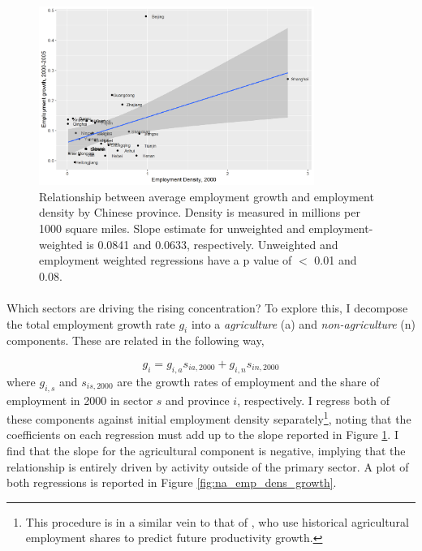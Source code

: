 \documentclass[]{article}
\theoremstyle{plain}
\begin{document}
\begin{center}
\begin{figure}[h]
	\centering
	\includegraphics[width=0.8\textwidth]{emp_growth_density.png}
	\caption{Relationship between average employment growth and employment density by Chinese province. Density is measured in millions per 1000 square miles. Slope estimate for unweighted and employment-weighted is 0.0841 and 0.0633, respectively.  Unweighted and employment weighted regressions have a p value of $<$ 0.01 and 0.08.}
	\label{fig:emp_dens_growth}
\end{figure}
\end{center}

\paragraph*{}
Which sectors are driving the rising concentration? To explore this, I decompose the total employment growth rate $g_{i}$ into a \textit{agriculture} (a) and \textit{non-agriculture} (n) components. These are related in the following way,

\begin{equation*}
g_{i} = g_{i, a}s_{ia, 2000} + g_{i, n}s_{in, 2000}
\end{equation*}
where $g_{i, s}$ and $s_{is, 2000}$ are the growth rates of employment and the share of employment in 2000 in sector $s$ and province $i$, respectively. I regress both of these components against initial employment density separately\footnote{This procedure is in a similar vein to that of \citet{urbstruct}, who use historical agricultural employment shares to predict future productivity growth.}, noting that the coefficients on each regression must add up to the slope reported in Figure \ref{fig:emp_dens_growth}. I find that the slope for the agricultural component is negative, implying that the relationship is entirely driven by activity outside of the primary sector. A plot of both regressions is reported in Figure \ref{fig:na_emp_dens_growth}.
\end{document}
